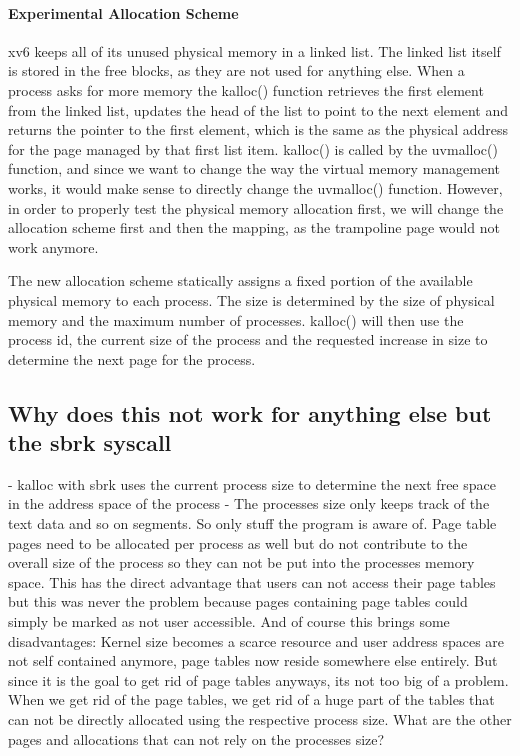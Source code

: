 \paragraph*{Experimental Allocation Scheme}
xv6 keeps all of its unused physical memory in a linked list. The linked list itself is stored
in the free blocks, as they are not used for anything else. When a process asks for more memory
the kalloc() function retrieves the first element from the linked list, updates the head
of the list to point to the next element and returns the pointer to the first element,
which is the same as the physical address for the page managed by that first list item.
kalloc() is called by the uvmalloc() function, and since we want to change the way
the virtual memory management works, it would make sense to directly change the uvmalloc() function.
However, in order to properly test the physical memory allocation first, we will change
the allocation scheme first and then the mapping, as the trampoline page would not work anymore.

The new allocation scheme statically assigns a fixed portion of the available physical memory
to each process. The size is determined by the size of physical memory and the maximum number
of processes.
kalloc() will then use the process id, the current size of the process and the requested
increase in size to determine the next page for the process.

\subsection*{Why does this not work for anything else but the sbrk syscall}
- kalloc with sbrk uses the current process size to determine the next free space in
the address space of the process
- The processes size only keeps track of the text data and so on segments. So only stuff
the program is aware of. Page table pages need to be allocated per process as well but
do not contribute to the overall size of the process so they can not be put into the
processes memory space. This has the direct advantage that users can not access their page tables
but this was never the problem because pages containing page tables could simply be marked
as not user accessible. And of course this brings some disadvantages: Kernel size becomes
a scarce resource and user address spaces are not self contained anymore, page tables now reside
somewhere else entirely.
But since it is the goal to get rid of page tables anyways, its not too big of a problem.
When we get rid of the page tables, we get rid of a huge part of the tables that can not
be directly allocated using the respective process size.
What are the other pages and allocations that can not rely on the processes size?

